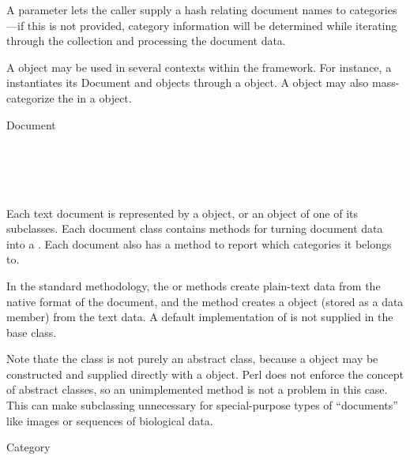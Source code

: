 \begin{description}
A  parameter lets the caller supply a hash
relating document names to categories---if this is not provided,
category information will be determined while iterating through the
collection and processing the document data.

A  object may be used in several contexts within the
framework.  For instance, a  instantiates its Document and
 objects through a  object.  A  object may
also mass-categorize the  in a  object.

\item
\begin{concreteclass}{Document}
 \attributes
   \\
   \\
 \methods
   \\
   \\
   \\
\end{concreteclass}

Each text document is represented by a  object, or an object
of one of its subclasses.  Each document class contains methods for
turning document data into a .  Each document also has
a method to report which categories it belongs to.

In the standard methodology, the  or
 methods create plain-text data from the
native format of the document, and the
 method creates a
 object (stored as a data member) from the text
data.  A default implementation of  is not supplied in
the base class.

Note thate the  class is not purely an abstract class,
because a  object may be constructed and supplied
directly with a  object.  Perl does not enforce
the concept of abstract classes, so an unimplemented 
method is not a problem in this case.  This can make subclassing
unnecessary for special-purpose types of ``documents'' like images or
sequences of biological data.

\item
\begin{concreteclass}{Category}
 \attributes
   \\
 \methods
   \\
   \\
\end{concreteclass}


\end{description}
